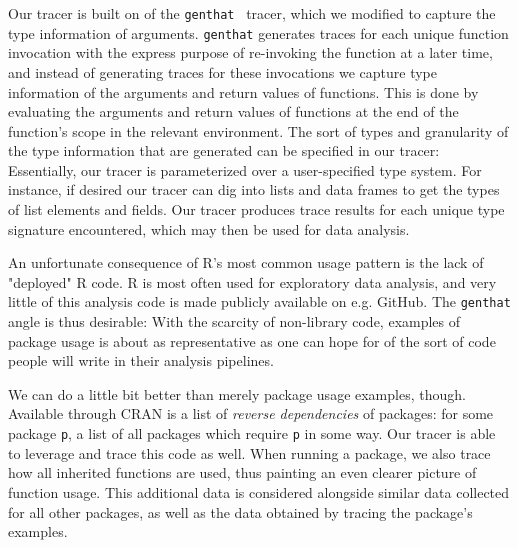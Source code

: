 \documentclass[acmsmall,10pt,review,anonymous]{acmart}\settopmatter{printfolios=true,printccs=false,printacmref=false}
\begin{document}

Our tracer is built on of the {\tt genthat}~\cite{issta18} tracer, which we modified to capture the type information of arguments.  
{\tt genthat} generates traces for each unique function invocation with the express purpose of re-invoking the function at a later time, and instead of generating traces for these invocations we capture type information of the arguments and return values of functions.
This is done by evaluating the arguments and return values of functions at the end of the function's scope in the relevant environment.  
The sort of types and granularity of the type information that are generated can be specified in our tracer: 
Essentially, our tracer is parameterized over a user-specified type system.  
For instance, if desired our tracer can dig into lists and data frames to get the types of list elements and fields.
Our tracer produces trace results for each unique type signature encountered, which may then be used for data analysis.

An unfortunate consequence of R's most common usage pattern is the lack of "deployed" R code. 
R is most often used for exploratory data analysis, and very little of this analysis code is made publicly available on e.g. GitHub.
The {\tt genthat} angle is thus desirable: 
With the scarcity of non-library code, examples of package usage is about as representative as one can hope for of the sort of code people will write in their analysis pipelines.

We can do a little bit better than merely package usage examples, though.
Available through CRAN is a list of {\it reverse dependencies} of packages: 
for some package {\tt p}, a list of all packages which require {\tt p} in some way.  
Our tracer is able to leverage and trace this code as well. 
When running a package, we also trace how all inherited functions are used, thus painting an even clearer picture of function usage.  
This additional data is considered alongside similar data collected for all other packages, as well as the data obtained by tracing the package's examples.

\end{document}
